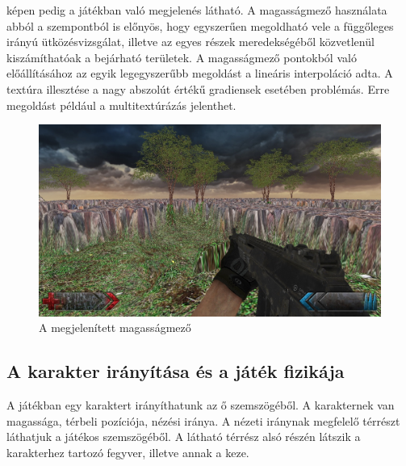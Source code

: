  képen pedig a játékban való megjelenés látható. A magasságmező használata abból a szempontból is előnyös, hogy egyszerűen megoldható vele a függőleges irányú ütközésvizsgálat, illetve az egyes részek meredekségéből közvetlenül kiszámíthatóak a bejárható területek. A magasságmező pontokból való előállításához az egyik legegyszerűbb megoldást a lineáris interpoláció adta. A textúra illesztése a nagy abszolút értékű gradiensek esetében problémás. Erre megoldást például a multitextúrázás jelenthet.

\begin{figure}[h]
\centering
\includegraphics[scale=0.4]{kepek/screenshot.png}
\caption{A megjelenített magasságmező}
\label{fig:screenshot}
\end{figure}

\subsection{A karakter irányítása és a játék fizikája}

A játékban egy karaktert irányíthatunk az ő szemszögéből. A karakternek van magassága, térbeli pozíciója, nézési iránya. A nézeti iránynak megfelelő térrészt láthatjuk a játékos szemszögéből. A látható térrész alsó részén látszik a karakterhez tartozó fegyver, illetve annak a keze.



